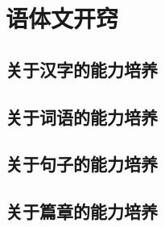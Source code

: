 \part{语体文开窍}
    \chapter{关于汉字的能力培养}
        
        
        
        
        
    \chapter{关于词语的能力培养}
        
        
        
        
        
        
        
        
    \chapter{关于句子的能力培养}
        
        
        
        
        
        
    \chapter{关于篇章的能力培养}
        
        
        
        
        